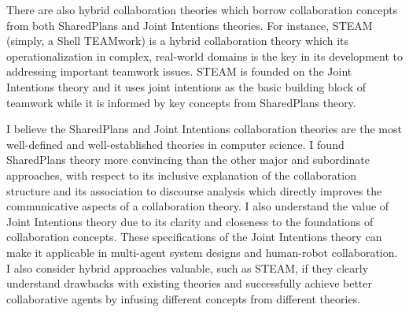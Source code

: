 \documentclass[a4paper, 10pt]{article}
\begin{document}
\begin{small}

There are also hybrid collaboration theories which borrow collaboration
concepts from both SharedPlans and Joint Intentions theories. For instance,
STEAM \cite{tambe:flexible-teamwork} (simply, a Shell TEAMwork) is a hybrid
collaboration theory which its operationalization in complex, real-world domains
is the key in its development to addressing important teamwork issues. STEAM is
founded on the Joint Intentions theory and it uses joint intentions as the basic
building block of teamwork while it is informed by key concepts from SharedPlans
theory.


I believe the SharedPlans and Joint Intentions collaboration theories are the
most well-defined and well-established theories in computer science. I found
SharedPlans theory more convincing than the other major and subordinate
approaches, with respect to its inclusive explanation of the collaboration
structure and its association to discourse analysis which directly improves the
communicative aspects of a collaboration theory. I also understand the value of
Joint Intentions theory due to its clarity and closeness to the foundations of
collaboration concepts. These specifications of the Joint Intentions theory can
make it applicable in multi-agent system designs and human-robot collaboration.
I also consider hybrid approaches valuable, such as STEAM, if they clearly
understand drawbacks with existing theories and successfully achieve better
collaborative agents by infusing different concepts from different theories.


\end{small}
\end{document}
